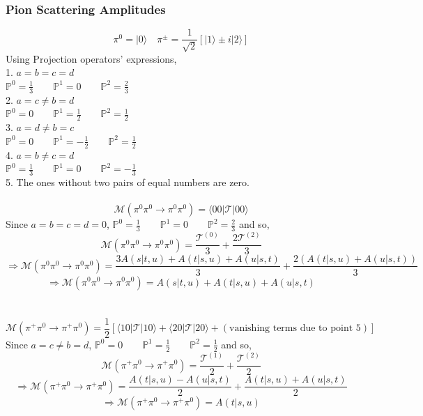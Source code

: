 ﻿\documentclass[12pt,a4paper]{article}
\begin{document}
\subsubsection{Pion Scattering Amplitudes}
$$
\pi^{0}=|0\rangle \quad \pi^{\pm}=\frac{1}{\sqrt{2}}[|1\rangle \pm i|2\rangle]
$$
Using Projection operators' expressions,\\
1. $a=b=c=d$\\
$\mathbb{P}^{0}=\frac{1}{3} \qquad \mathbb{P}^{1}=0 \qquad \mathbb{P}^{2}=\frac{2}{3}$\\
2. $a=c\neq b=d$\\
$\mathbb{P}^{0}=0 \qquad \mathbb{P}^{1}=\frac{1}{2} \qquad \mathbb{P}^{2}=\frac{1}{2}$\\
3. $a=d \neq b=c$\\
$\mathbb{P}^{0}=0 \qquad \mathbb{P}^{1}=-\frac{1}{2} \qquad \mathbb{P}^{2}=\frac{1}{2}$\\
4. $a=b\neq c=d$\\
$\mathbb{P}^{0}=\frac{1}{3} \qquad \mathbb{P}^{1}=0 \qquad \mathbb{P}^{2}=-\frac{1}{3}$\\
5. The ones without two pairs of equal numbers are zero.\\\\
$$\mathcal{M}(\pi^{0} \pi^{0} \rightarrow \pi^{0}\pi^{0})=\langle00|\mathcal{T}|00\rangle$$
Since $a=b=c=d=0$, $\mathbb{P}^{0}=\frac{1}{3} \qquad \mathbb{P}^{1}=0 \qquad \mathbb{P}^{2}=\frac{2}{3}$ and so,
$$\mathcal{M}(\pi^{0} \pi^{0} \rightarrow \pi^{0}\pi^{0})=\frac{\mathcal{T}^{(0)}}{3}+\frac{2\mathcal{T}^{(2)}}{3}$$
$$\Rightarrow \mathcal{M}(\pi^{0} \pi^{0} \rightarrow \pi^{0}\pi^{0})=\frac{3 A(s|t, u)+A(t|s, u)+A(u|s, t)}{3}+\frac{2(A(t|s, u)+A(u|s, t))}{3}$$
$$\Rightarrow \mathcal{M}(\pi^{0} \pi^{0} \rightarrow \pi^{0}\pi^{0})=A(s|t, u)+A(t|s, u)+A(u|s, t)$$
\\\\
$$\mathcal{M}(\pi^{+} \pi^{0} \rightarrow \pi^{+}\pi^{0})=\frac{1}{2} \left[\langle10|\mathcal{T}|10\rangle+\langle20|\mathcal{T}|20\rangle+(\text{vanishing terms due to point 5})\right]$$
Since $a=c\neq b=d$, $\mathbb{P}^{0}=0 \qquad \mathbb{P}^{1}=\frac{1}{2} \qquad \mathbb{P}^{2}=\frac{1}{2}$ and so,
$$\mathcal{M}(\pi^{+} \pi^{0} \rightarrow \pi^{+}\pi^{0})=\frac{\mathcal{T}^{(1)}}{2}+\frac{\mathcal{T}^{(2)}}{2}$$
$$\Rightarrow \mathcal{M}(\pi^{+} \pi^{0} \rightarrow \pi^{+}\pi^{0})=\frac{A(t|s, u)-A(u|s, t)}{2}+\frac{A(t|s, u)+A(u|s, t)}{2}$$
$$\Rightarrow \mathcal{M}(\pi^{+} \pi^{0} \rightarrow \pi^{+}\pi^{0})=A(t|s, u)$$
\\\\
\end{document}
